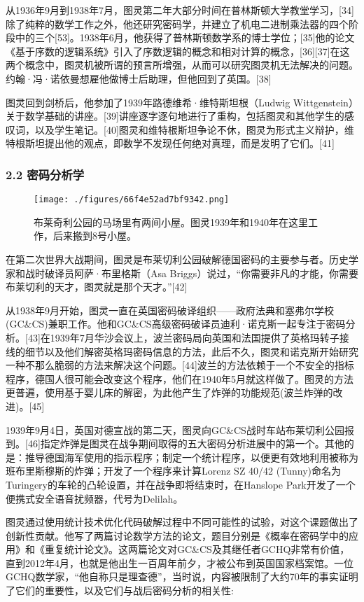 从1936年9月到1938年7月，图灵第二年大部分时间在普林斯顿大学教堂学习，[34]除了纯粹的数学工作之外，他还研究密码学，并建立了机电二进制乘法器的四个阶段中的三个[53]。1938年6月，他获得了普林斯顿数学系的博士学位；[35]他的论文《基于序数的逻辑系统》引入了序数逻辑的概念和相对计算的概念，[36][37]在这两个概念中，图灵机被所谓的预言所增强，从而可以研究图灵机无法解决的问题。约翰·冯·诺依曼想雇他做博士后助理，但他回到了英国。[38]

图灵回到剑桥后，他参加了1939年路德维希·维特斯坦根（Ludwig Wittgenstein）关于数学基础的讲座。[39]讲座逐字逐句地进行了重构，包括图灵和其他学生的感叹词，以及学生笔记。[40]图灵和维特根斯坦争论不休，图灵为形式主义辩护，维特根斯坦提出他的观点，即数学不发现任何绝对真理，而是发明了它们。[41]
\subsubsection{2.2 密码分析学}
\begin{figure}[ht]
\centering
\texttt{[image: ./figures/66f4e52ad7bf9342.png]}
\caption{布莱奇利公园的马场里有两间小屋。图灵1939年和1940年在这里工作，后来搬到8号小屋。} \label{fig_ALTL_2}
\end{figure}
在第二次世界大战期间，图灵是布莱切利公园破解德国密码的主要参与者。历史学家和战时破译员阿萨·布里格斯（Asa Briggs）说过，“你需要非凡的才能，你需要布莱切利的天才，图灵就是那个天才。”[42]

从1938年9月开始，图灵一直在英国密码破译组织——政府法典和塞弗尔学校(GC&CS)兼职工作。他和GC&CS高级密码破译员迪利·诺克斯一起专注于密码分析。[43]在1939年7月华沙会议上，波兰密码局向英国和法国提供了英格玛转子接线的细节以及他们解密英格玛密码信息的方法，此后不久，图灵和诺克斯开始研究一种不那么脆弱的方法来解决这个问题。[44]波兰的方法依赖于一个不安全的指标程序，德国人很可能会改变这个程序，他们在1940年5月就这样做了。图灵的方法更普遍，使用基于婴儿床的解密，为此他产生了炸弹的功能规范(波兰炸弹的改进)。[45]

1939年9月4日，英国对德宣战的第二天，图灵向GC&CS战时车站布莱切利公园报到。[46]指定炸弹是图灵在战争期间取得的五大密码分析进展中的第一个。其他的是：推导德国海军使用的指示程序；制定一个统计程序，以便更有效地利用被称为班布里斯穆斯的炸弹；开发了一个程序来计算Lorenz SZ 40/42 (Tunny)命名为Turingery的车轮的凸轮设置，并在战争即将结束时，在Hanslope Park开发了一个便携式安全语音扰频器，代号为Delilah。

图灵通过使用统计技术优化代码破解过程中不同可能性的试验，对这个课题做出了创新性贡献。他写了两篇讨论数学方法的论文，题目分别是《概率在密码学中的应用》和《重复统计论文》。这两篇论文对GC&CS及其继任者GCHQ非常有价值，直到2012年4月，也就是他出生一百周年前夕，才被公布到英国国家档案馆。一位GCHQ数学家，“他自称只是理查德”，当时说，内容被限制了大约70年的事实证明了它们的重要性，以及它们与战后密码分析的相关性:

